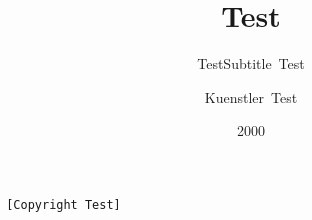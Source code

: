 \documentclass{scrartcl}
\title{Test}
\subtitle{TestSubtitle~Test}\author{Kuenstler~Test}
\date{2000}
\begin{document}
\maketitle
\texttt{
{[}Copyright~Test{]}
}
\end{document}

